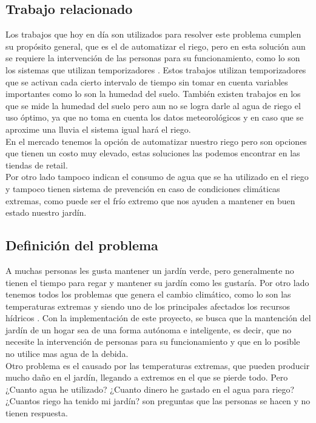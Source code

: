 \documentclass[11pt,letterpaper]{article}
\begin{document}
\newpage

\subsection{Trabajo relacionado} 
Los trabajos que hoy en día son utilizados para resolver este problema cumplen su propósito general, que es el de automatizar el riego, pero en esta solución aun se requiere la intervención de las personas para su funcionamiento, como lo son los sistemas que utilizan temporizadores \citep{temporizador}. Estos trabajos utilizan temporizadores que se activan cada cierto intervalo de tiempo sin tomar en cuenta variables importantes como lo son la humedad del suelo. También existen trabajos en los que se mide la humedad del suelo \citep{temporizadorSensorHumedad} pero aun no se logra darle al agua de riego el uso óptimo, ya que no toma en cuenta los datos meteorológicos y en caso que se aproxime una lluvia el sistema igual hará el riego.\\
En el mercado tenemos la opción de automatizar nuestro riego pero son opciones que tienen un costo muy elevado, estas soluciones las podemos encontrar en las tiendas de retail.\\
Por otro lado tampoco indican el consumo de agua que se ha utilizado en el riego y tampoco tienen sistema de prevención en caso de condiciones climáticas extremas, como puede ser el frío extremo que nos ayuden a mantener en buen estado nuestro jardín.


\subsection{Definición del problema} 
A muchas personas les gusta mantener un jardín verde, pero generalmente no tienen el tiempo para regar y mantener su jardín como les gustaría. Por otro lado tenemos todos los problemas que genera el cambio climático, como lo son las temperaturas extremas y siendo uno de los principales afectados los recursos hídricos \citep{cambioClimatico}. Con la implementación de este proyecto, se busca que la mantención del jardín de un hogar sea de una forma autónoma e inteligente, es decir, que no necesite la intervención de personas para su funcionamiento y que en lo posible no utilice mas agua de la debida.\\
Otro problema es el causado por las temperaturas extremas, que pueden producir mucho daño en el jardín, llegando a extremos en el que se pierde todo. Pero ¿Cuanto agua he utilizado? ¿Cuanto dinero  he gastado en el agua para riego? ¿Cuantos riego ha tenido mi jardín? son preguntas que las personas se hacen y no tienen respuesta.
\end{document}

